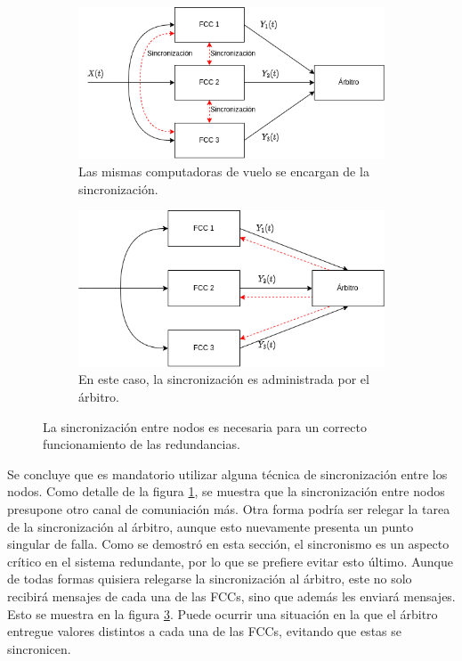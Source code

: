 \begin{figure}[H]
    \centering
    \begin{subfigure}[b]{0.49\textwidth}
        \includegraphics[width=\textwidth]{img/3_4_1_sincronizacion_3.png}
        \caption{Las mismas computadoras de vuelo se encargan de la sincronización.}
        \label{fig:3_4_1_sincronizacion_3}
    \end{subfigure}
    \begin{subfigure}[b]{0.49\textwidth}
        \includegraphics[width=\textwidth]{img/3_4_1_sincronizacion_4.png}
        \caption{En este caso, la sincronización es administrada por el árbitro.}
        \label{fig:3_4_1_sincronizacion_4}
    \end{subfigure}
    \caption{La sincronización entre nodos es necesaria para un correcto funcionamiento de las redundancias.}
\end{figure}

Se concluye que es mandatorio utilizar alguna técnica de sincronización entre los nodos. Como detalle de la figura \ref{fig:3_4_1_sincronizacion_3}, se muestra que la sincronización entre nodos presupone otro canal de comuniación más. Otra forma podría ser relegar la tarea de la sincronización al árbitro, aunque esto nuevamente presenta un punto singular de falla. Como se demostró en esta sección, el sincronismo es un aspecto crítico en el sistema redundante, por lo que se prefiere evitar esto último. Aunque de todas formas quisiera relegarse la sincronización al árbitro, este no solo recibirá mensajes de cada una de las FCCs, sino que además les enviará mensajes. Esto se muestra en la figura \ref{fig:3_4_1_sincronizacion_4}. Puede ocurrir una situación en la que el árbitro entregue valores distintos a cada una de las FCCs, evitando que estas se sincronicen.

